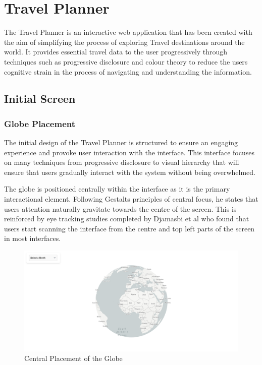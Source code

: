 \documentclass[]{project_final}
\begin{document}
\section{Travel Planner}
The Travel Planner is an interactive web application that has been created with the aim
of simplifying the process of exploring Travel destinations around the world. It provides
essential travel data to the user progressively through techniques such as progressive disclosure and colour theory to reduce the users cognitive strain in the process of navigating and understanding the information.

\subsection{Initial Screen}
\subsubsection{Globe Placement}
The initial design of the Travel Planner is structured to ensure an engaging experience and provoke user interaction with the interface. This interface focuses on many techniques from progressive disclosure to visual hierarchy that will ensure that users gradually interact with the system without being overwhelmed.

The globe is positioned centrally within the interface as it is the primary interactional element. Following Gestalts principles of central focus, he states that users attention naturally gravitate towards the centre of the screen. This is reinforced by eye tracking studies completed by Djamasbi et al who found that users start scanning the interface from the centre and top left parts of the screen in most interfaces.

\begin{figure}[ht!]
    \centering
    \includegraphics[width=\textwidth]{1.png}
    \caption{Central Placement of the Globe}
    \label{fig:1}
\end{figure}
\end{document}
